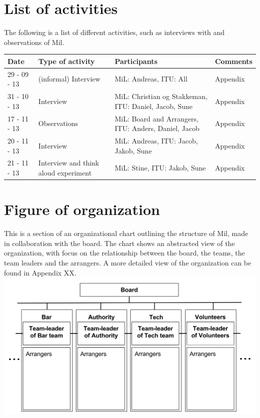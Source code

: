 \section{List of activities}
The following is a list of different activities, such as interviews with and observations of Mil.
\begin{center}
\begin{table}[H]
    \begin{tabular}{|p{3cm}|p{3cm}|p{3cm}|p{6cm}|}
    \hline
    \textbf{Date} & \textbf{Type of activity} & \textbf{Participants} & \textbf{Comments} \\ \hline
    29 - 09 - 13 & (informal) Interview & MiL: Andreas, ITU: All & Appendix  \\ \hline
    31 - 10 - 13 & Interview & MiL: Christian og Stakkeman, ITU: Daniel, Jacob, Sune &  Appendix  \\ \hline
    17 - 11 - 13 & Observations & MiL: Board and Arrangers, ITU: Anders, Daniel, Jacob & Appendix \\ \hline
    20 - 11 - 13 & Interview & MiL: Andreas, ITU: Jacob, Jakob, Sune & Appendix \\ \hline
    21 - 11 - 13 & Interview and think aloud experiment & MiL: Stine, ITU: Jakob, Sune & Appendix \\ \hline
    \end{tabular}
\end{table}
\end{center}

\section{Figure of organization}
\label{sec:organisation}
This is a section of an organizational chart outlining the structure of Mil, made in collaboration with the board. The chart shows an abstracted view of the organization, with focus on the relationship between the board, the teams, the team leaders and the arrangers. A more detailed view of the organization can be found in Appendix XX.\\
\includegraphics[scale=0.7]{Pictures/MIL_Organisational_chart_Abstract.png}
